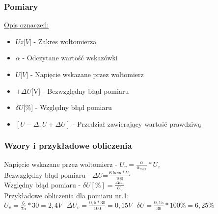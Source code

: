 \documentclass{extarticle}  %
\begin{document}
            \subsubsection{Pomiary}
                \begin{table}[H]
                    \caption{Wyniki pomiarowe oraz błędy pomiarowe dla ustalonego napięcia 3V }
                    \centering
                \end{table}
                \underline{Opis oznaczeń:}
                \begin{itemize}
                    \item $Uz{[}V{]}$ - Zakres woltomierza
                    \item $\alpha$ - Odczytane wartość wskazówki
                    \item $U{[}V{]}$ - Napięcie wskazane przez woltomierz
                    \item $\pm \Delta U${[}V{]} - Bezwzględny błąd pomiaru
                    \item $\delta U${[}\%{]} - Względny błąd pomiaru
                    \item $[U-\Delta ; U+\Delta U] $ - Przedział zawierający wartość prawdziwą
                \end{itemize}
            \subsubsection{Wzory i przykładowe obliczenia}
                Napięcie wskazane przez woltomierz - $U_v=\frac{\alpha}{\alpha_{max}}*U_z$\\
                Bezwzględny błąd pomiaru - $ \Delta U$=$\frac{Klasa*U_z}{100}$\\
                Względny błąd pomiaru - $\delta U[\%]=\frac{\Delta U_v}{U_v}$\\
                Przykładowe obliczenia dla pomiaru nr.1:\\
                $U_v=\frac{6}{75}\ast 30=2,4V \ \ \ \Delta U_v=\frac{0,5\ast 30}{100}=0,15V \ \ \ \delta U=\frac{0,15}{30}\ast 100\%=6,25\%$
            
\end{document}
